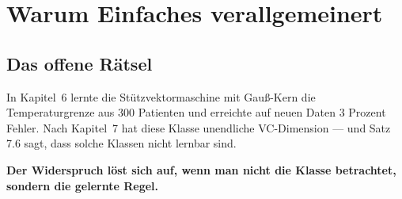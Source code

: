 \chapter{Warum Einfaches verallgemeinert}

\section{Das offene Rätsel}

\begin{merksatz}
In Kapitel~6 lernte die Stützvektormaschine mit Gauß-Kern die Temperaturgrenze aus $300$ Patienten und erreichte auf neuen Daten $3$ Prozent Fehler. Nach Kapitel~7 hat diese Klasse unendliche VC-Dimension --- und Satz 7.6 sagt, dass solche Klassen nicht lernbar sind.

\begin{center}
\begin{minipage}{0.9\textwidth}
\textbf{Der Widerspruch löst sich auf, wenn man nicht die Klasse betrachtet, sondern die gelernte Regel.}
\end{minipage}
\end{center}

\begin{center}
\begin{minipage}{0.88\textwidth}
\end{minipage}
\end{center}
\end{merksatz}

